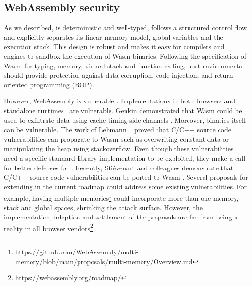 \subsection{WebAssembly security}

As we described, \wasm is deterministic and well-typed, follows a structured control flow and explicitly separates its linear memory model, global variables and the execution stack. This design is robust \cite{WebAssemblySecurity} and makes it easy for compilers and engines to sandbox the execution of Wasm  binaries. Following the specification of Wasm  for typing, memory, virtual stack and function calling,
host environments should provide protection against data corruption, code injection, and return-oriented programming (ROP).

However, WebAssembly is vulnerable \cite{ChromeZero}.
Implementations in both browsers and standalone runtimes~\cite{Narayan2021Swivel} are vulnerable.
Genkin \etal demonstrated that Wasm  could be used to exfiltrate data using cache timing-side channels \cite{Genkin2018DrivebyKC}.
Moreover, binaries itself can be vulnerable. The work of Lehmann \etal ~\cite{usenixWasm2020} proved that C/C++ source code vulnerabilities can propagate to Wasm  such as overwriting constant data or manipulating the heap using stackoverflow. Even though these vulnerabilities need a specific standard library implementation to be exploited, they make a call for better defenses for \wasm. 
Recently, Stiévenart and colleagues demonstrate that C/C++ source code vulnerabilities can be ported to Wasm \cite{DeRoover2022}.
Several proposals for extending \wasm in the current roadmap could address some existing vulnerabilities. For example, having multiple memories\footnote{\url{https://github.com/WebAssembly/multi-memory/blob/main/proposals/multi-memory/Overview.md}} could incorporate more than one memory, stack and global spaces, shrinking the attack surface. However, the implementation, adoption and settlement of the proposals are far from being a reality in all browser vendors\footnote{\url{https://webassembly.org/roadmap/}}. 
